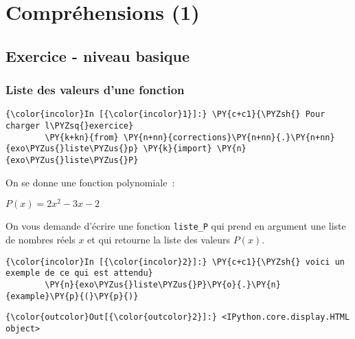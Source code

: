     
    
    
    

    

    \hypertarget{compruxe9hensions-1}{%
\section{Compréhensions (1)}\label{compruxe9hensions-1}}

    \hypertarget{exercice---niveau-basique}{%
\subsection{Exercice - niveau basique}\label{exercice---niveau-basique}}

    \hypertarget{liste-des-valeurs-dune-fonction}{%
\subsubsection{Liste des valeurs d'une
fonction}\label{liste-des-valeurs-dune-fonction}}

    \begin{Verbatim}[commandchars=\\\{\}]
{\color{incolor}In [{\color{incolor}1}]:} \PY{c+c1}{\PYZsh{} Pour charger l\PYZsq{}exercice}
        \PY{k+kn}{from} \PY{n+nn}{corrections}\PY{n+nn}{.}\PY{n+nn}{exo\PYZus{}liste\PYZus{}p} \PY{k}{import} \PY{n}{exo\PYZus{}liste\PYZus{}P}
\end{Verbatim}


    On se donne une fonction polynomiale~:

\(P(x) = 2x^2 - 3x - 2\)

    On vous demande d'écrire une fonction \texttt{liste\_P} qui prend en
argument une liste de nombres réels \(x\) et qui retourne la liste des
valeurs \(P(x)\).

    \begin{Verbatim}[commandchars=\\\{\}]
{\color{incolor}In [{\color{incolor}2}]:} \PY{c+c1}{\PYZsh{} voici un exemple de ce qui est attendu}
        \PY{n}{exo\PYZus{}liste\PYZus{}P}\PY{o}{.}\PY{n}{example}\PY{p}{(}\PY{p}{)}
\end{Verbatim}


\begin{Verbatim}[commandchars=\\\{\}]
{\color{outcolor}Out[{\color{outcolor}2}]:} <IPython.core.display.HTML object>
\end{Verbatim}
            
